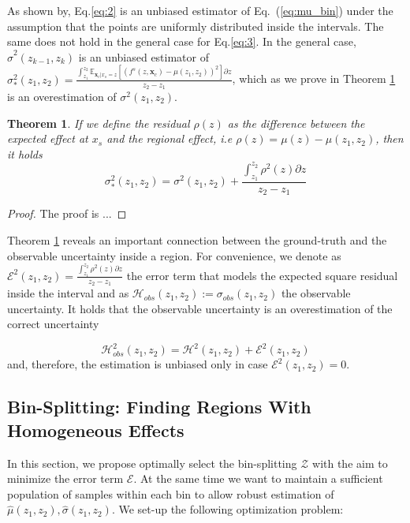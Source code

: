 \documentclass[twoside]{article}
\newtheorem{theorem}{Theorem}[section]
\newcommand{\xc}{\mathbf{x}_c}
\begin{document}
As shown by\citep{gkolemis22}, Eq.\eqref{eq:2} is an unbiased
estimator of Eq.~(\ref{eq:mu_bin}) under the assumption that the
points are uniformly distributed inside the intervals. The same does
not hold in the general case for Eq.\eqref{eq:3}. In the general case,
\(\hat{\sigma}^2(z_{k-1}, z_k)\) is an unbiased estimator of
\(\sigma^2_*(z_1, z_2) = \frac{\int_{z_1}^{z_2} \mathbb{E}_{\xc|x_s=z}
  \left [ (f^s(z, \xc) - \mu(z_1, z_2) )^2 \right] \partial z}{z_2 -
  z_1}\), which as we prove in Theorem \ref{sec:theorem-1} is an
overestimation of \(\sigma^2(z_1, z_2)\).

\begin{theorem}
  \label{sec:theorem-1}
If we define the residual \(\rho(z)\) as the difference
  between the expected effect at \(x_s\) and the regional effect, i.e
  \(\rho(z) = \mu(z) - \mu(z_1, z_2)\), then it holds
\begin{equation}
    \label{eq:bin-uncertainty-proof}
 \sigma_*^2(z_1, z_2) = \sigma^2(z_1, z_2) + \frac{\int_{z_1}^{z_2}\rho^2(z) \partial z}{z_2 - z_1}
\end{equation}
  \end{theorem}

\begin{proof}
The proof is ...
\end{proof}

\noindent
Theorem \ref{sec:theorem-1} reveals an important connection between
the ground-truth and the observable uncertainty inside a region. For
convenience, we denote as
\(\mathcal{E}^2(z_1, z_2) = \frac{\int_{z_1}^{z_2}\rho^2(z) \partial
  z}{z_2 - z_1}\) the error term that models the expected square
residual inside the interval and as
\(\mathcal{H}_{obs}(z_1, z_2) := \sigma_{obs}(z_1, z_2)\) the
observable uncertainty. It holds that the observable uncertainty is an
overestimation of the correct uncertainty

\begin{equation}
  \label{eq:uncertainty-bin}
  \mathcal{H}^2_{obs}(z_1, z_2) = \mathcal{H}^2(z_1, z_2) + \mathcal{E}^2(z_1, z_2)
\end{equation}
%
and, therefore, the estimation is unbiased only in case
\(\mathcal{E}^2(z_1, z_2) = 0\).

\subsection{Bin-Splitting: Finding Regions With Homogeneous Effects}
\label{sec:bin-spliting}

In this section, we propose optimally select the bin-splitting
\(\mathcal{Z}\) with the aim to minimize the error term
\(\mathcal{E}\). At the same time we want to maintain a sufficient
population of samples within each bin to allow robust estimation of
\(\hat{\mu}(z_1, z_2), \hat{\sigma}(z_1, z_2)\). We set-up the
following optimization problem:
\end{document}
